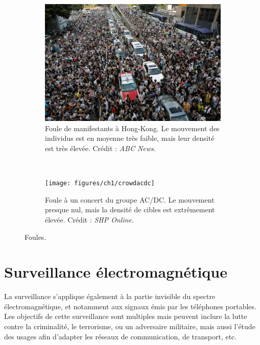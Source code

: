 	\begin{figure}[!htbp]
		\begin{subfigure}[t]{0.49\textwidth}
			\centering
			\includegraphics[width=\textwidth]{figures/ch1/crowdhk}
			\caption[Foule de manifestants à Hong-Kong]{Foule de manifestants à Hong-Kong. Le mouvement des individus est en moyenne très faible, mais leur densité est très élevée. Crédit : \emph{ABC News}.}
			\label{fig:crowdhk}
		\end{subfigure}
		~
		\begin{subfigure}[t]{0.49\textwidth}
			\centering
			\texttt{[image: figures/ch1/crowdacdc]}
			\caption[Foule à un concert]{Foule à un concert du groupe AC/DC. Le mouvement presque nul, mais la densité de cibles est extrêmement élevée. Crédit : \emph{SHP Online}\footnotemark.}
			\label{fig:crowdacdc}
		\end{subfigure}
		\label{fig:crowds}
		\caption{Foules.}
	\end{figure}
	

	
	\section{Surveillance électromagnétique}
	La surveillance s'applique également à la partie invisible du spectre électromagnétique, et notamment aux signaux émis par les téléphones portables. Les objectifs de cette surveillance sont multiples mais peuvent inclure la lutte contre la criminalité, le terrorisme, ou un adversaire militaire, mais aussi l'étude des usages afin d'adapter les réseaux de communication, de transport, etc.	
	
